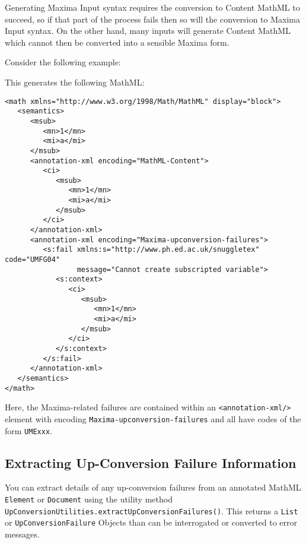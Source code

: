 Generating Maxima Input syntax requires the conversion to Content MathML to
succeed, so if that part of the process fails then so will the conversion to
Maxima Input syntax. On the other hand, many inputs will generate Content MathML
which cannot then be converted into a sensible Maxima form.

Consider the following example:


This generates the following MathML:

\begin{verbatim}
<math xmlns="http://www.w3.org/1998/Math/MathML" display="block">
   <semantics>
      <msub>
         <mn>1</mn>
         <mi>a</mi>
      </msub>
      <annotation-xml encoding="MathML-Content">
         <ci>
            <msub>
               <mn>1</mn>
               <mi>a</mi>
            </msub>
         </ci>
      </annotation-xml>
      <annotation-xml encoding="Maxima-upconversion-failures">
         <s:fail xmlns:s="http://www.ph.ed.ac.uk/snuggletex" code="UMFG04"
                 message="Cannot create subscripted variable">
            <s:context>
               <ci>
                  <msub>
                     <mn>1</mn>
                     <mi>a</mi>
                  </msub>
               </ci>
            </s:context>
         </s:fail>
      </annotation-xml>
   </semantics>
</math>
\end{verbatim}

Here, the Maxima-related failures are contained within an
\verb|<annotation-xml/>| element with encoding \verb|Maxima-upconversion-failures|
and all have codes of the form \verb|UMExxx|.

\subsection*{Extracting Up-Conversion Failure Information}

You can extract details of any up-conversion failures from an annotated MathML
\verb|Element| or \verb|Document| using the utility method
\verb|UpConversionUtilities.extractUpConversionFailures()|. This returns
a \verb|List| or \verb|UpConversionFailure| Objects than can be interrogated or
converted to error messages.
